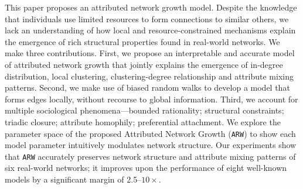 
This paper proposes an attributed network growth model. Despite the knowledge
that individuals use limited resources to form connections to similar others, we
lack an understanding of how local and resource-constrained mechanisms explain
the emergence of rich structural properties found in real-world networks. We
make three contributions. First, we propose an interpretable and accurate model
of attributed network growth that jointly explains the emergence of in-degree
distribution, local clustering, clustering-degree relationship and attribute
mixing patterns. Second, we make use of biased random walks to develop a model
that forms edges locally, without recourse to global information. Third, we
account for multiple sociological phenomena---bounded rationality; structural
constraints; triadic closure; attribute homophily; preferential attachment.
We explore the parameter space of the proposed Attributed Network Growth (\texttt{ARW})
to show each model parameter intuitively modulates network structure.
Our experiments show that \texttt{ARW} accurately preserves network structure and attribute mixing patterns of
six real-world networks; it improves upon the performance of eight
well-known models by a significant margin of
2.5--$10\times$.


